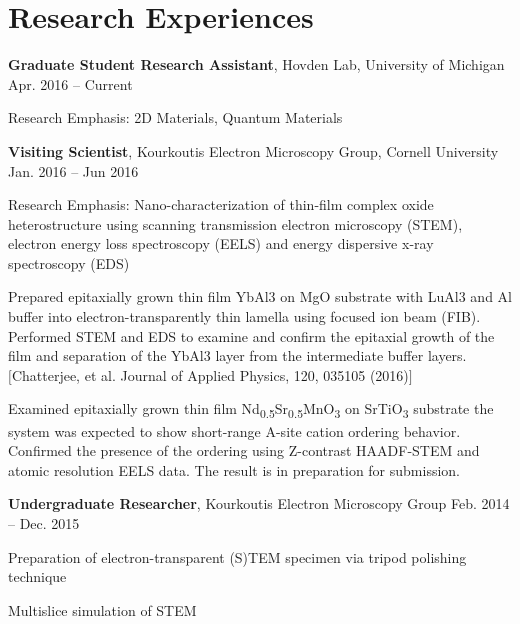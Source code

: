 \documentclass{myCV}
\begin{document}
\section*{Research Experiences}
    \begin{entry}
        \textbf{Graduate Student Research Assistant}, Hovden Lab, University of Michigan \hfill Apr. 2016 -- Current\par
        Research Emphasis: 2D Materials, Quantum Materials
    \end{entry}
    \begin{entry}
        \textbf{Visiting Scientist}, Kourkoutis Electron Microscopy Group, Cornell University \hfill Jan. 2016 -- Jun 2016\par
        Research Emphasis: Nano-characterization of thin-film complex oxide heterostructure using scanning transmission electron microscopy (STEM), electron energy loss spectroscopy (EELS) and energy dispersive x-ray spectroscopy (EDS)\par
        \sbt{} Prepared epitaxially grown thin film YbAl3 on MgO substrate with LuAl3 and Al buffer into electron-transparently thin lamella using focused ion beam (FIB).\\
        \hspace{2em} Performed STEM and EDS to examine and confirm the epitaxial growth of the film and separation of the YbAl3 layer from the intermediate buffer layers.\\
        \hspace{2em} $[$Chatterjee, et al. Journal of Applied Physics, 120, 035105 (2016)$]$\par

        \sbt{} Examined epitaxially grown thin film Nd\textsubscript{0.5}Sr\textsubscript{0.5}MnO\textsubscript{3} on SrTiO\textsubscript{3} substrate the system was expected to show short-range A-site cation ordering behavior.\\
        Confirmed the presence of the ordering using Z-contrast HAADF-STEM and atomic resolution EELS data. The result is in preparation for submission.

    \end{entry}
    \begin{entry}
        \textbf{Undergraduate Researcher}, Kourkoutis Electron Microscopy Group \hfill Feb. 2014 -- Dec. 2015\par
        \sbt{} Preparation of electron-transparent (S)TEM specimen via tripod polishing technique\par
        \sbt{} Multislice simulation of STEM
    \end{entry}
    
\end{document}
